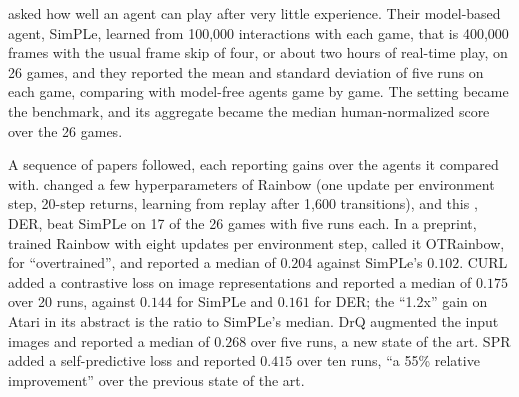 \begin{refsection}
\Textcite{KaiserEtAl2020} asked how well an agent can play after very little experience. Their model-based agent, SimPLe, learned from 100{,}000 interactions with each game, that is 400{,}000 frames with the usual frame skip of four, or about two hours of real-time play, on 26 games, and they reported the mean and standard deviation of five runs on each game, comparing with model-free agents game by game. The setting became the  benchmark, and its aggregate became the median human-normalized score over the 26 games.

A sequence of papers followed, each reporting gains over the agents it compared with. \Textcite{vanHasseltEtAl2019} changed a few hyperparameters of Rainbow \parencite{HesselEtAl2018} (one update per environment step, 20-step returns, learning from replay after 1{,}600 transitions), and this , DER, beat SimPLe on 17 of the 26 games with five runs each. In a preprint, \textcite{Kielak2020} trained Rainbow with eight updates per environment step, called it OTRainbow, for ``overtrained'', and reported a median of $0.204$ against SimPLe's $0.102$. CURL \parencite{LaskinEtAl2020} added a contrastive loss on image representations and reported a median of $0.175$ over 20 runs, against $0.144$ for SimPLe and $0.161$ for DER; the ``1.2x'' gain on Atari in its abstract is the ratio to SimPLe's median. DrQ \parencite{YaratsEtAl2021} augmented the input images and reported a median of $0.268$ over five runs, a new state of the art. SPR \parencite{SchwarzerEtAl2021} added a self-predictive loss and reported $0.415$ over ten runs, ``a 55\% relative improvement'' over the previous state of the art.


\end{refsection}
